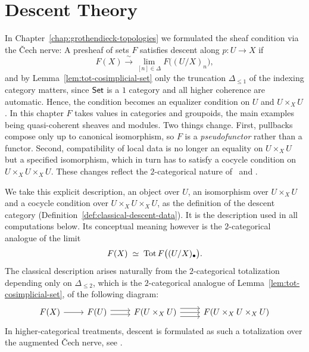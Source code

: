 \chapter{Descent Theory}\label{chap:descent-theory}

In Chapter~\ref{chap:grothendieck-topologies} we formulated the sheaf condition via the \v{C}ech nerve: A presheaf of sets $F$ satisfies descent along $p:U\to X$ if
\[
F(X)\xrightarrow{\ \sim\ }\lim_{[n]\in\Delta}F\bigl((U/X)_n\bigr),
\]
and by Lemma~\ref{lem:tot-cosimplicial-set} only the truncation $\Delta_{\le 1}$ of the indexing category matters, since $\mathsf{Set}$ is a $1$ category and all higher coherence are automatic. Hence, the condition becomes an equalizer condition on $U$ and $U\times_XU$. In this chapter $F$ takes values in categories and groupoids, the main examples being quasi-coherent sheaves and modules. Two things change. First, pullbacks compose only up to canonical isomorphism, so $F$ is a \emph{pseudofunctor} rather than a functor.
Second, compatibility of local data is no longer an equality on $U\times_XU$ but a specified isomorphism, which in turn has to satisfy a cocycle condition on $U\times_XU\times_XU$.
These changes reflect the $2$-categorical nature of \Cat\ and \Grpd.

We take this explicit description, an object over $U$, an isomorphism over $U\times_XU$ and a cocycle condition over $U\times_XU\times_XU$, as the definition of the descent category (Definition~\ref{def:classical-descent-data}). It is the description used in all computations below. Its conceptual meaning however is the $2$-categorical analogue of the limit
\[
F(X)\;\simeq\;\operatorname{Tot} F\bigl((U/X)_\bullet\bigr).
\]
The classical description arises naturally from the $2$-categorical totalization depending only on $\Delta_{\le 2}$, which is the $2$-categorical analogue of Lemma~\ref{lem:tot-cosimplicial-set}, of the following diagram:
\[\begin{tikzcd}
	{F(X)} & {F(U)} & {F(U\times_XU)} & {F(U\times_XU\times_XU)}
	\arrow[from=1-1, to=1-2]
	\arrow[shift right, from=1-2, to=1-3]
	\arrow[shift left, from=1-2, to=1-3]
	\arrow[from=1-3, to=1-4]
	\arrow[shift left=2, from=1-3, to=1-4]
	\arrow[shift right=2, from=1-3, to=1-4]
\end{tikzcd}\]
In higher-categorical treatments, descent is formulated as such a totalization over the augmented \v{C}ech nerve, see \cite{khan2022stacks}. 

